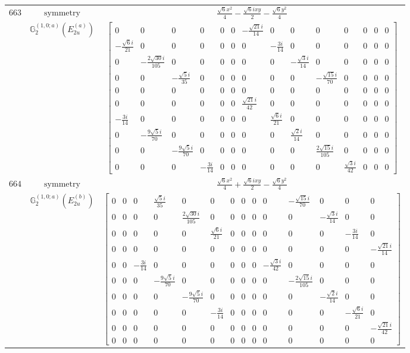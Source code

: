 \documentclass[fleqn,8pt,landscape]{jsarticle}
\begin{document}
\begin{longtable}{ccc}
$ 663 $ & $ \text{symmetry} $ & $ \frac{\sqrt{6} x^{2}}{4} - \frac{\sqrt{6} i x y}{2} - \frac{\sqrt{6} y^{2}}{4} $ \\
$  $ & $ \mathbb{G}_{2}^{(1,0;a)}(E_{2u}^{(a)}) $ & $ \begin{bmatrix} 0 & 0 & 0 & 0 & 0 & 0 & - \frac{\sqrt{21} i}{14} & 0 & 0 & 0 & 0 & 0 & 0 & 0 \\ - \frac{\sqrt{6} i}{21} & 0 & 0 & 0 & 0 & 0 & 0 & - \frac{3 i}{14} & 0 & 0 & 0 & 0 & 0 & 0 \\ 0 & - \frac{2 \sqrt{30} i}{105} & 0 & 0 & 0 & 0 & 0 & 0 & - \frac{\sqrt{3} i}{14} & 0 & 0 & 0 & 0 & 0 \\ 0 & 0 & - \frac{\sqrt{5} i}{35} & 0 & 0 & 0 & 0 & 0 & 0 & - \frac{\sqrt{15} i}{70} & 0 & 0 & 0 & 0 \\ 0 & 0 & 0 & 0 & 0 & 0 & 0 & 0 & 0 & 0 & 0 & 0 & 0 & 0 \\ 0 & 0 & 0 & 0 & 0 & 0 & \frac{\sqrt{21} i}{42} & 0 & 0 & 0 & 0 & 0 & 0 & 0 \\ - \frac{3 i}{14} & 0 & 0 & 0 & 0 & 0 & 0 & \frac{\sqrt{6} i}{21} & 0 & 0 & 0 & 0 & 0 & 0 \\ 0 & - \frac{9 \sqrt{5} i}{70} & 0 & 0 & 0 & 0 & 0 & 0 & \frac{\sqrt{2} i}{14} & 0 & 0 & 0 & 0 & 0 \\ 0 & 0 & - \frac{9 \sqrt{5} i}{70} & 0 & 0 & 0 & 0 & 0 & 0 & \frac{2 \sqrt{15} i}{105} & 0 & 0 & 0 & 0 \\ 0 & 0 & 0 & - \frac{3 i}{14} & 0 & 0 & 0 & 0 & 0 & 0 & \frac{\sqrt{3} i}{42} & 0 & 0 & 0 \end{bmatrix} $ \\ \hline
$ 664 $ & $ \text{symmetry} $ & $ \frac{\sqrt{6} x^{2}}{4} + \frac{\sqrt{6} i x y}{2} - \frac{\sqrt{6} y^{2}}{4} $ \\
$  $ & $ \mathbb{G}_{2}^{(1,0;a)}(E_{2u}^{(b)}) $ & $ \begin{bmatrix} 0 & 0 & 0 & \frac{\sqrt{5} i}{35} & 0 & 0 & 0 & 0 & 0 & 0 & - \frac{\sqrt{15} i}{70} & 0 & 0 & 0 \\ 0 & 0 & 0 & 0 & \frac{2 \sqrt{30} i}{105} & 0 & 0 & 0 & 0 & 0 & 0 & - \frac{\sqrt{3} i}{14} & 0 & 0 \\ 0 & 0 & 0 & 0 & 0 & \frac{\sqrt{6} i}{21} & 0 & 0 & 0 & 0 & 0 & 0 & - \frac{3 i}{14} & 0 \\ 0 & 0 & 0 & 0 & 0 & 0 & 0 & 0 & 0 & 0 & 0 & 0 & 0 & - \frac{\sqrt{21} i}{14} \\ 0 & 0 & - \frac{3 i}{14} & 0 & 0 & 0 & 0 & 0 & 0 & - \frac{\sqrt{3} i}{42} & 0 & 0 & 0 & 0 \\ 0 & 0 & 0 & - \frac{9 \sqrt{5} i}{70} & 0 & 0 & 0 & 0 & 0 & 0 & - \frac{2 \sqrt{15} i}{105} & 0 & 0 & 0 \\ 0 & 0 & 0 & 0 & - \frac{9 \sqrt{5} i}{70} & 0 & 0 & 0 & 0 & 0 & 0 & - \frac{\sqrt{2} i}{14} & 0 & 0 \\ 0 & 0 & 0 & 0 & 0 & - \frac{3 i}{14} & 0 & 0 & 0 & 0 & 0 & 0 & - \frac{\sqrt{6} i}{21} & 0 \\ 0 & 0 & 0 & 0 & 0 & 0 & 0 & 0 & 0 & 0 & 0 & 0 & 0 & - \frac{\sqrt{21} i}{42} \\ 0 & 0 & 0 & 0 & 0 & 0 & 0 & 0 & 0 & 0 & 0 & 0 & 0 & 0 \end{bmatrix} $ \\ \hline

\end{longtable}
\end{document}
